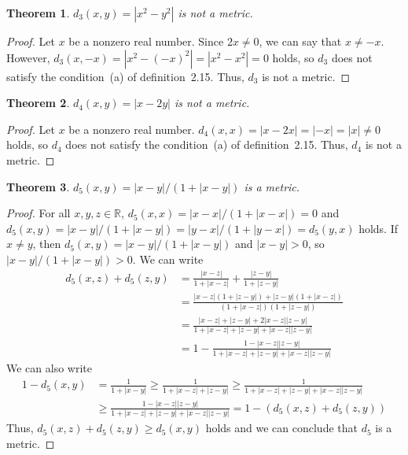 \documentclass{scrartcl}
\newtheorem{theorem}{Theorem}
\begin{document}
\begin{theorem}
  \(d_3(x, y) = |x^2 - y^2|\) is not a metric.
\end{theorem}
\begin{proof}
  Let \(x\) be a nonzero real number.
  Since \(2x \not = 0\), we can say that \(x \not = -x\).
  However, \(d_3(x, -x) = |x^2 - (-x)^2| = |x^2 - x^2| = 0\) holds, so \(d_3\) does not satisfy the condition~(a) of definition~2.15.
  Thus, \(d_3\) is not a metric.
\end{proof}

\begin{theorem}
  \(d_4(x, y) = |x - 2y|\) is not a metric.
\end{theorem}
\begin{proof}
  Let \(x\) be a nonzero real number.
  \(d_4(x, x) = |x - 2x| = |-x| = |x| \not = 0\) holds, so \(d_4\) does not satisfy the condition~(a) of definition~2.15.
  Thus, \(d_4\) is not a metric.
\end{proof}

\begin{theorem}
  \(d_5(x, y) = |x - y| / (1 + |x - y|)\) is a metric.
\end{theorem}
\begin{proof}
  For all \(x, y, z \in \mathbb{R}\), \(d_5(x, x) = |x - x| / (1 + |x - x|) = 0\) and \(d_5(x, y) = |x - y| / (1 + |x - y|) = |y - x| / (1 + |y - x|) = d_5(y, x)\) holds.
  If \(x \not = y\), then \(d_5(x, y) = |x - y| / (1 + |x - y|)\) and \(|x - y| > 0\), so \(|x - y| / (1 + |x - y|) > 0\).
  We can write
  \begin{align*}
    d_5(x, z) + d_5(z, y) &= \frac{|x - z|}{1 + |x - z|} + \frac{|z - y|}{1 + |z - y|} \\
                          &= \frac{|x - z|(1 + |z - y|) + |z - y|(1 + |x - z|)}{(1 + |x - z|)(1 + |z - y|)} \\
                          &= \frac{|x - z| + |z - y| + 2|x - z||z - y|}{1 + |x - z| + |z - y| + |x - z||z - y|} \\
                          &= 1 - \frac{1 - |x - z||z - y|}{1 + |x - z| + |z - y| + |x - z||z - y|}
  \end{align*}
  We can also write
  \begin{align*}
    1 - d_5(x, y) &= \frac{1}{1 + |x - y|} \geq \frac{1}{1 + |x - z| + |z - y|} \geq \frac{1}{1 + |x - z| + |z - y| + |x - z||z - y|} \\
                  &\geq \frac{1 - |x - z||z - y|}{1 + |x - z| + |z - y| + |x - z||z - y|} = 1 - (d_5(x, z) + d_5(z, y))
  \end{align*}
  Thus, \(d_5(x, z) + d_5(z, y) \geq d_5(x, y)\) holds and we can conclude that \(d_5\) is a metric.
\end{proof}
\end{document}
